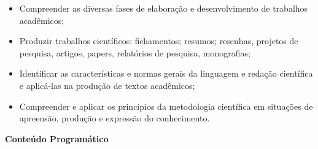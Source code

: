 \begin{itemize}
\item Compreender as diversas fases de elaboração e desenvolvimento de trabalhos acadêmicos;

\item Produzir trabalhos científicos: fichamentos; resumos; resenhas, projetos de pesquisa, artigos, papers, relatórios de pesquisa, monografias;

\item Identificar as características e normas gerais da linguagem e redação científica e aplicá-las na produção de textos acadêmicos;

\item Compreender e aplicar os princípios da metodologia científica em situações de apreensão, produção e expressão do conhecimento.

\end{itemize} 


\begin{snugshade}\begin{center}\textbf{
    Conteúdo Programático
}\end{center}\end{snugshade}

